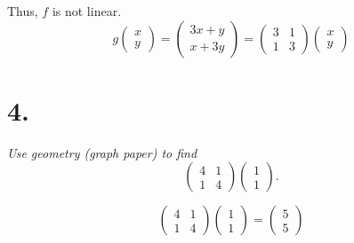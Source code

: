 \documentclass[12pt]{article}
\begin{document}
Thus, $f$ is not linear.
\begin{equation*}
	g
	\begin{pmatrix}
		x \\
		y
	\end{pmatrix}
	=
	\begin{pmatrix}
		3x + y \\
		x + 3y
	\end{pmatrix}
	=
	\boxed{
		\begin{pmatrix}
			3 & 1 \\
			1 & 3
		\end{pmatrix}
		\begin{pmatrix}
			x \\
			y
		\end{pmatrix}
	}
\end{equation*}

\section*{4.}
\textit{Use geometry (graph paper) to find}
\begin{equation*}
	\begin{pmatrix}
		4 & 1 \\
		1 & 4
	\end{pmatrix}
	\begin{pmatrix}
		1 \\
		1
	\end{pmatrix}
	.
\end{equation*}
\bigskip

\begin{equation*}
	\begin{pmatrix}
		4 & 1 \\
		1 & 4
	\end{pmatrix}
	\begin{pmatrix}
		1 \\
		1
	\end{pmatrix}
	=
	\boxed{
		\begin{pmatrix}
			5 \\
			5
		\end{pmatrix}
	}
\end{equation*}
\end{document}
